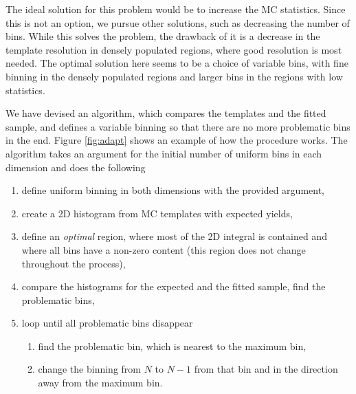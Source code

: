The ideal solution for this problem would be to increase the MC statistics. Since this is not an option, we pursue other solutions, such as decreasing the number of bins. While this solves the problem, the drawback of it is a decrease in the template resolution in densely populated regions, where good resolution is most needed. The optimal solution here seems to be a choice of variable bins, with fine binning in the densely populated regions and larger bins in the regions with low statistics.

We have devised an algorithm, which compares the templates and the fitted sample, and defines a variable binning so that there are no more problematic bins in the end. Figure \ref{fig:adapt} shows an example of how the procedure works. The algorithm takes an argument for the initial number of uniform bins in each dimension and does the following
\begin{enumerate}
	\item define uniform binning in both dimensions with the provided argument,
	\item create a 2D histogram from MC templates with expected yields,
	\item define an \textit{optimal} region, where most of the 2D integral is contained and where all bins have a non-zero content (this region does not change throughout the process),
	\item compare the histograms for the expected and the fitted sample, find the problematic bins,
	\item loop until all problematic bins disappear
	\begin{enumerate}
		\item find the problematic bin, which is nearest to the maximum bin,
		\item change the binning from $N$ to $N-1$ from that bin and in the direction away from the maximum bin.
	\end{enumerate}
\end{enumerate}

